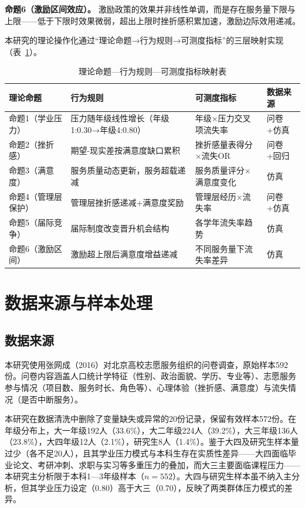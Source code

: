 \documentclass[12pt,a4paper]{article}
\begin{document}
\textbf{命题6（激励区间效应）。} 激励政策的效果并非线性单调，而是存在服务量下限与上限——低于下限时效果微弱，超出上限时挫折感积累加速，激励边际效用递减。

本研究的理论操作化通过“理论命题→行为规则→可测度指标”的三层映射实现（表~\ref{tab:theory_map}）。

\begin{table}[H]
\centering
\caption{理论命题—行为规则—可测度指标映射表}
\label{tab:theory_map}
\begin{tabular}{p{2.2cm}p{3.8cm}p{3.5cm}p{2.5cm}}
\toprule
理论命题 & 行为规则 & 可测度指标 & 数据来源 \\
\midrule
命题1（学业压力） & 压力随年级线性增长（年级1:0.30→年级4:0.80） & 年级×压力交叉项流失率 & 问卷+仿真 \\
命题2（挫折感） & 期望-现实差按满意度缺口累积 & 挫折感量表得分×流失OR & 问卷+回归 \\
命题3（满意度） & 服务质量动态更新，服务超载递减 & 服务质量评分×满意度变化 & 仿真 \\
命题4（管理层保护） & 管理层挫折感递减+满意度奖励 & 管理层经历×流失率 & 问卷+仿真 \\
命题5（届际竞争） & 届际制度改变晋升机会结构 & 各学年流失率趋势 & 仿真 \\
命题6（激励区间） & 激励超上限后满意度增益递减 & 不同服务量下流失率差异 & 仿真 \\
\bottomrule
\end{tabular}
\end{table}

\section{数据来源与样本处理}

\subsection{数据来源}

本研究使用张网成（2016）对北京高校志愿服务组织的问卷调查，原始样本592份。问卷内容涵盖人口统计学特征（性别、政治面貌、学历、专业等）、志愿服务参与情况（项目数、服务时长、角色等）、心理体验（挫折感、满意度）与流失情况（是否中断服务）。

本研究在数据清洗中删除了变量缺失或异常的20份记录，保留有效样本572份。在年级分布上，大一年级192人（33.6\%），大二年级224人（39.2\%），大三年级136人（23.8\%），大四年级12人（2.1\%），研究生8人（1.4\%）。鉴于大四及研究生样本量过少（各不足20人），且其学业压力模式与本科生存在实质性差异——大四面临毕业论文、考研冲刺、求职与实习等多重压力的叠加，而大三主要面临课程压力——本研究主分析限于本科1—3年级样本（$n = 552$）。大四与研究生样本虽不纳入主分析，但其学业压力设定（0.80）高于大三（0.70），反映了两类群体压力模式的差异。
\end{document}
